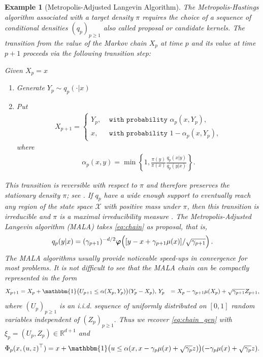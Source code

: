 \documentclass[bj]{imsart}
\newtheorem{example}[thm]{Example}
\begin{document}
\begin{example}[Metropolis-Adjusted Langevin Algorithm]
The Metropolis-Hastings algorithm
associated with a target density \(\pi\) requires the choice of a sequence of conditional densities  \((q_p)_{p\geq 1}\) also called proposal or candidate kernels. The transition from the value  of the Markov chain \(X_p\)  at time \(p\)
and its value at time \(p + 1\) proceeds via the following transition step:

\begin{algorithm}[H]
Given \(X_p=x\)\;
\begin{enumerate}
\item Generate \(Y_p\sim q_p(\cdot|x)\)\;
\item Put
\begin{eqnarray*}
X_{p+1}=
\begin{cases}
Y_p, & \texttt{ with probability } \alpha_p(x,Y_p),
\\
x, &  \texttt{ with probability } 1-\alpha_p(x,Y_p),
\end{cases}
\end{eqnarray*}
where
\begin{eqnarray*}
\alpha_p(x,y)=\min\left\{1,\frac{\pi(y)}{\pi(x)}\frac{q_p(x|y)}{q_p(y|x)}\right\}.
\end{eqnarray*}
\end{enumerate}
\end{algorithm}
This transition is reversible with respect to \(\pi\) and therefore preserves the stationary density \(\pi\); see \cite[Chapter~2]{moulines2018}. If \(q_p\) have a wide enough
support to eventually reach any region
of the state space \(\mathcal{X}\) with positive mass
under \(\pi\), then this transition is irreducible and $\pi$ is a maximal irreducibility measure \cite{mengersen:tweedie:1996}. The  Metropolis-Adjusted Langevin algorithm (MALA) takes  \eqref{eq:chain} as proposal, that is,
\begin{eqnarray*}
q_p(y|x)=(\gamma_{p+1})^{-d/2}\boldsymbol{\varphi}\Bigl([y-x+\gamma_{p+1}\mu(x)]/\sqrt{\gamma_{p+1}}\Bigr) \,.
\end{eqnarray*}
The MALA algorithms usually provide noticeable speed-ups in convergence for most problems. It is not difficult to see that the MALA chain can be compactly represented in the form
\begin{align*}
X_{p+1} &=X_p+\mathbbm{1}\bigl(U_{p+1}\leq \alpha(X_{p},Y_{p})\bigr)(Y_{p}-X_p),  \,
Y_{p}&=X_p-\gamma_{p+1}\mu(X_p)+\sqrt{\gamma_{p+1}}Z_{p+1},
\end{align*}
where \((U_{p})_{p\geq 1}\) is an i.i.d. sequence of uniformly distributed on \([0,1]\) random variables independent of \((Z_p)_{p\geq 1}.\) Thus we recover \eqref{eq:chain_gen} with  \(\xi_p=(U_p,Z_p)\in \mathbb{R}^{d+1}\) and
\begin{eqnarray*}
\Phi_p(x,(u,z)^\top)=x+\mathbbm{1}\bigl(u\leq \alpha(x,x-\gamma_{p}\mu(x)+\sqrt{\gamma_{p}}z)\bigr)(-\gamma_{p}\mu(x)+\sqrt{\gamma_{p}}z).
\end{eqnarray*}
\end{example}
\end{document}
